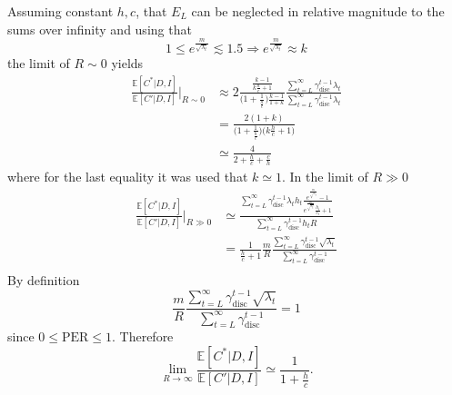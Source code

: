 Assuming constant $h,c$, that $E_L$ can be neglected in relative magnitude to the sums over infinity and using that \begin{equation}
	1\leq e^{\frac{m}{\sqrt{\lambda_t}}}\lesssim 1.5 \Rightarrow  e^{\frac{m}{\sqrt{\lambda_t}}}\approx k
\end{equation}
the limit of $R\sim 0$ yields
\begin{equation}
	\begin{split}
		\frac{\mathbb{E}[C^*|D,I]}{\mathbb{E}[C'|D,I]}\bigg|_{R\sim 0} 
		&\approx 2 \frac{\frac{k-1}{k\frac{h}{c} + 1}}{\big(1 + \frac{1}{\frac{h}{c}}\big)\frac{k-1}{1+k}} \frac{\sum_{t=L}^{\infty} \gamma_{\text{disc}}^{t-1} \lambda_t}{\sum_{t=L}^{\infty} \gamma_{\text{disc}}^{t-1} \lambda_t} \\
		&= \frac{2(1+k)}{\big(1 + \frac{1}{\frac{h}{c}}\big)\big(k\frac{h}{c} + 1\big)} \\
		&\simeq \frac{4}{2 + \frac{h}{c} + \frac{c}{h}}
	\end{split}
\end{equation}
where for the last equality it was used that $k\simeq 1$. In the limit of $R\gg 0$
\begin{equation}
	\begin{split}
		\frac{\mathbb{E}[C^*|D,I] }{\mathbb{E}[C'|D,I]}\bigg|_{R\gg 0} &\simeq \frac{\sum_{t=L}^{\infty} \gamma_{\text{disc}}^{t-1} \lambda_th_t\frac{e^{\frac{m}{\sqrt{\lambda_t}}}-1}{e^{\frac{m}{\sqrt{\lambda_t}}}\frac{h_t}{c_t}+1}}{\sum_{t=L}^{\infty} \gamma_{\text{disc}}^{t-1}h_t R} \\
		&=\frac{1}{\frac{h}{c}+1} \frac{m}{R}\frac{\sum_{t=L}^{\infty} \gamma_{\text{disc}}^{t-1} \sqrt{\lambda_t}}{\sum_{t=L}^{\infty} \gamma_{\text{disc}}^{t-1}} \\
	\end{split}
\end{equation}
By definition
\begin{equation}
	\frac{m}{R}\frac{\sum_{t=L}^{\infty} \gamma_{\text{disc}}^{t-1} \sqrt{\lambda_t}}{\sum_{t=L}^{\infty} \gamma_{\text{disc}}^{t-1}} = 1 
\end{equation}
since $0\leq \text{PER}\leq 1$. Therefore
\begin{equation}
	\lim\limits_{R\rightarrow \infty}\frac{\mathbb{E}[C^*|D,I] }{\mathbb{E}[C'|D,I]} \simeq \frac{1}{1+\frac{h}{c}}.
\end{equation}